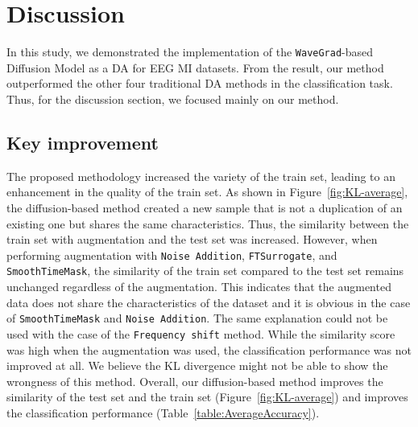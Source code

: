 \section{Discussion}
In this study, we demonstrated the implementation of the \texttt{WaveGrad}-based Diffusion Model as a DA for EEG MI datasets.
From the result, our method outperformed the other four traditional DA methods in the classification task.
Thus, for the discussion section, we focused mainly on our method.

\subsection{Key improvement}
The proposed methodology increased the variety of the train set, leading to an enhancement in the quality of the train set.
As shown in Figure~\ref{fig:KL-average}, the diffusion-based method created a new sample that is not a duplication of an existing one but shares the same characteristics.
Thus, the similarity between the train set with augmentation and the test set was increased. 
However, when performing augmentation with \texttt{Noise Addition}, \texttt{FTSurrogate}, and \texttt{SmoothTimeMask}, the similarity of the train set compared to the test set remains unchanged regardless of the augmentation.
This indicates that the augmented data does not share the characteristics of the dataset and it is obvious in the case of \texttt{SmoothTimeMask} and \texttt{Noise Addition}.
The same explanation could not be used with the case of the \texttt{Frequency shift} method.
While the similarity score was high when the augmentation was used, the classification performance was not improved at all. 
We believe the KL divergence might not be able to show the wrongness of this method.
Overall, our diffusion-based method improves the similarity of the test set and the train set (Figure~\ref{fig:KL-average}) and improves the classification performance (Table~\ref{table:AverageAccuracy}).

